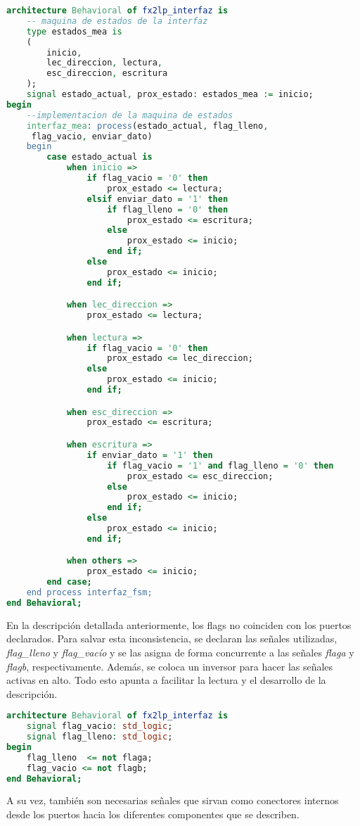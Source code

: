 \begin{lstlisting}[language=VHDL,backgroundcolor=\color{gray!30}]
architecture Behavioral of fx2lp_interfaz is
	-- maquina de estados de la interfaz
	type estados_mea is
	(
		inicio,
		lec_direccion, lectura,
		esc_direccion, escritura
	);
	signal estado_actual, prox_estado: estados_mea := inicio;
begin
	--implementacion de la maquina de estados
	interfaz_mea: process(estado_actual, flag_lleno,
	 flag_vacio, enviar_dato)
	begin
		case estado_actual is
			when inicio =>
				if flag_vacio = '0' then
					prox_estado <= lectura;
				elsif enviar_dato = '1' then
					if flag_lleno = '0' then
						prox_estado <= escritura;
					else
						prox_estado <= inicio;
					end if;
				else
					prox_estado <= inicio;
				end if;

			when lec_direccion =>
				prox_estado <= lectura;

			when lectura =>
				if flag_vacio = '0' then
					prox_estado <= lec_direccion;
				else
					prox_estado <= inicio;
				end if;

			when esc_direccion =>
				prox_estado <= escritura;

			when escritura =>
				if enviar_dato = '1' then
					if flag_vacio = '1' and flag_lleno = '0' then
						prox_estado <= esc_direccion;
					else
						prox_estado <= inicio;
					end if;
				else
					prox_estado <= inicio;
				end if;

			when others =>
				prox_estado <= inicio;
		end case;
	end process interfaz_fsm;
end Behavioral;
\end{lstlisting}

En la descripción detallada anteriormente, los flags no coinciden con los puertos declarados. Para salvar esta inconsistencia, se declaran las señales utilizadas, {\it flag\_lleno} y {\it flag\_vacío} y se las asigna de forma concurrente a las señales {\it flaga} y {\it flagb}, respectivamente. Además, se coloca un inversor para hacer las señales activas en alto. Todo esto apunta a facilitar la lectura y el desarrollo de la descripción.

\begin{lstlisting}[language=VHDL,backgroundcolor=\color{gray!30}]
architecture Behavioral of fx2lp_interfaz is
	signal flag_vacio: std_logic;
	signal flag_lleno: std_logic;
begin
	flag_lleno  <= not flaga;
	flag_vacio <= not flagb;
end Behavioral;	
\end{lstlisting}

A su vez, también son necesarias señales que sirvan como conectores internos desde los puertos hacia los diferentes componentes que se describen.

